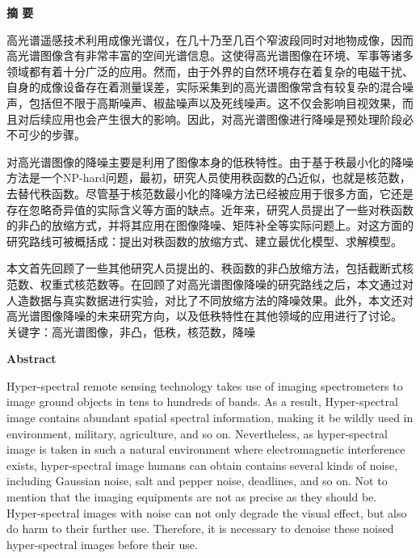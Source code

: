 \documentclass[12pt, a4paper]{article}
\begin{document}

	
\begin{center}
{\Large{\bf{摘 \quad 要}}}
\end{center}
\par 高光谱遥感技术利用成像光谱仪，在几十乃至几百个窄波段同时对地物成像，因而高光谱图像含有非常丰富的空间光谱信息。这使得高光谱图像在环境、军事等诸多领域都有着十分广泛的应用。然而，由于外界的自然环境存在着复杂的电磁干扰、自身的成像设备存在着测量误差，实际采集到的高光谱图像常含有较复杂的混合噪声，包括但不限于高斯噪声、椒盐噪声以及死线噪声。这不仅会影响目视效果，而且对后续应用也会产生很大的影响。因此，对高光谱图像进行降噪是预处理阶段必不可少的步骤。
\par 对高光谱图像的降噪主要是利用了图像本身的低秩特性。由于基于秩最小化的降噪方法是一个NP-hard问题，最初，研究人员使用秩函数的凸近似，也就是核范数，去替代秩函数。尽管基于核范数最小化的降噪方法已经被应用于很多方面，它还是存在忽略奇异值的实际含义等方面的缺点。近年来，研究人员提出了一些对秩函数的非凸的放缩方式，并将其应用在图像降噪、矩阵补全等实际问题上。对这方面的研究路线可被概括成：提出对秩函数的放缩方式、建立最优化模型、求解模型。
\par 本文首先回顾了一些其他研究人员提出的、秩函数的非凸放缩方法，包括截断式核范数、权重式核范数等。在回顾了对高光谱图像降噪的研究路线之后，本文通过对人造数据与真实数据进行实验，对比了不同放缩方法的降噪效果。此外，本文还对高光谱图像降噪的未来研究方向，以及低秩特性在其他领域的应用进行了讨论。
\\
\newline
关键字：高光谱图像，非凸，低秩，核范数，降噪
\newpage
\begin{center}
{\Large{\bf{Abstract}}}
\end{center}
\par Hyper-spectral remote sensing technology takes use of imaging spectrometers to image ground objects in tens to hundreds of bands. As a result, Hyper-spectral image contains abundant spatial spectral information, making it be wildly used in environment, military, agriculture, and so on. Nevertheless, as hyper-spectral image is taken in such a natural environment where electromagnetic interference exists, hyper-spectral image humans can obtain contains several kinds of noise, including Gaussian noise, salt and pepper noise, deadlines, and so on. Not to mention that the imaging equipments are not as precise as they should be. Hyper-spectral images with noise can not only degrade the visual effect, but also do harm to their further use. Therefore, it is necessary to denoise these noised hyper-spectral images before their use.
\end{document}
